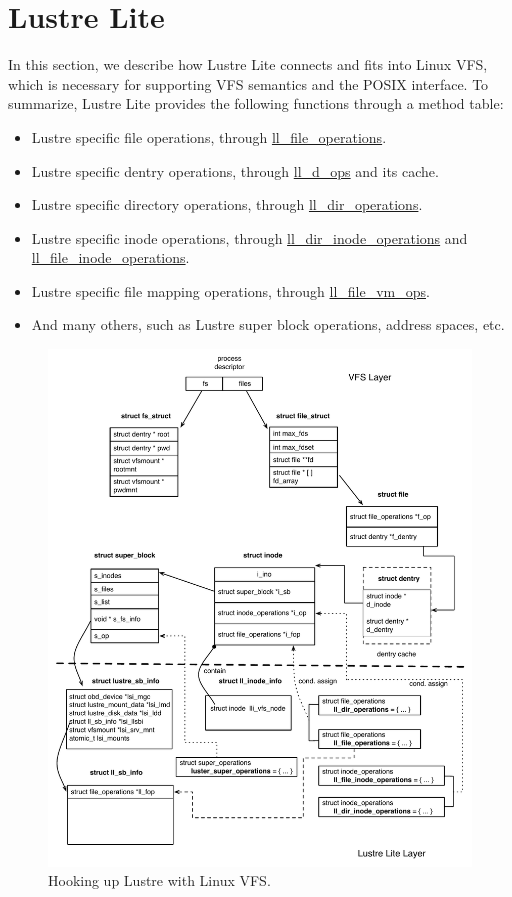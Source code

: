 \section{Lustre Lite}

In this section, we describe how Lustre Lite connects and fits into
Linux VFS, which is necessary for  supporting VFS semantics and the POSIX
interface. To summarize, Lustre Lite provides the following functions through
a method table:

\begin{itemize}

  \item Lustre specific file operations, through
  \url{ll_file_operations}.

  \item Lustre specific dentry operations, through \url{ll_d_ops} and
  its cache.

  \item Lustre specific directory operations, through
  \url{ll_dir_operations}.

  \item Lustre specific inode operations, through
  \url{ll_dir_inode_operations} and \url{ll_file_inode_operations}.

  \item Lustre specific file mapping operations, through
  \url{ll_file_vm_ops}.

  \item And many others, such as Lustre super block operations, address
  spaces, etc.

\end{itemize}

\begin{figure}[hbt]
\centering
\includegraphics[width=5in]{img/lustre_vfs}
\caption{Hooking up Lustre with Linux VFS.}
\label{fig:vfs}
\end{figure}

